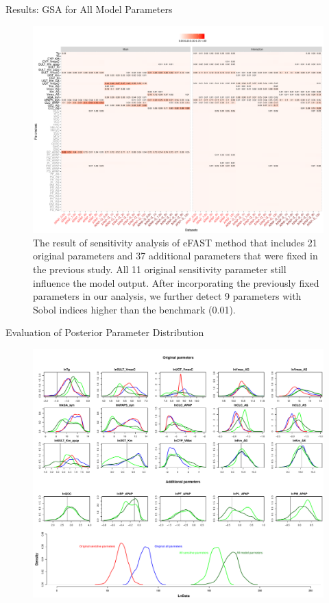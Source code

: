 \documentclass[xcolor=table]{beamer}
\begin{document}
\begin{frame}[t]
\begin{columns}[t]
\begin{column}{0.23\paperwidth} %
%
%
\begin{block}{Results: GSA for All Model Parameters}
\begin{figure}
\includegraphics[width=0.98\linewidth]{fig5.pdf}
\caption{The result of sensitivity analysis of eFAST method that includes 21 original parameters and 37 additional parameters that were fixed in the previous study. 
All 11 original sensitivity parameter still influence the model output. After incorporating the previously fixed parameters in our analysis, we further detect 9 parameters with Sobol indices higher than the benchmark (0.01).}
\end{figure}
\end{block}
%
\begin{block}{Evaluation of Posterior Parameter Distribution}
\begin{figure}
\includegraphics[width=0.98\linewidth]{fig6.pdf}

\end{figure}
\end{block}
\end{column}
\end{columns}
\end{frame}
\end{document}
